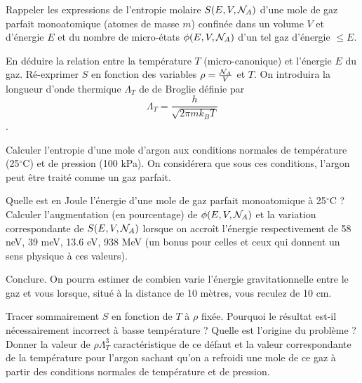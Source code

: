 \question
Rappeler les expressions de l'entropie molaire $S(E,V,{\cal N}_A)$ d'une mole de gaz parfait monoatomique (atomes de masse $m$) confinée dans un volume $V$ et d'énergie $E$ et du nombre de micro-états $\phi(E,V,{\cal N}_A)$ d'un tel gaz d'énergie $\leq E$. 

\question En déduire la relation entre la température $T$ (micro-canonique) et l'énergie $E$ du gaz. Ré-exprimer $S$ en fonction des variables $\rho=\frac{{\cal N}_A}{V}$ et $T$. On introduira la longueur d'onde thermique $\Lambda_T$ de de Broglie définie par
$$\Lambda_T=\frac{h}{\sqrt{2 \pi m k_B T}}$$.

\question Calculer l'entropie d'une mole d'argon aux conditions normales de température (25$^\circ$C) et de pression (100 kPa).
On considérera que sous ces conditions, l'argon peut être traité comme un gaz parfait.

\question Quelle est en Joule l'énergie d'une mole de gaz parfait monoatomique à  25$^\circ$C ? Calculer l'augmentation (en pourcentage) de $\phi(E,V,{\cal N}_A)$ et la variation correspondante de $S(E,V,{\cal N}_A)$  lorsque on accroît l'énergie respectivement de 58 neV, 39 meV, 13.6 eV, 938 MeV (un bonus pour celles et ceux qui donnent un sens physique à ces valeurs). 

\question Conclure. On pourra estimer de combien varie l'énergie gravitationnelle entre le gaz et vous lorsque, situé à la distance de 10 mètres, vous reculez de 10 cm.

\question Tracer sommairement $S$ en fonction de $T$ à $\rho$ fixée. Pourquoi le résultat est-il nécessairement incorrect à basse température ? Quelle est l'origine du problème ? Donner la valeur de $\rho \Lambda_T^3 $ caractéristique de ce défaut et la valeur correspondante de la température pour l'argon sachant qu'on a refroidi une mole de ce gaz à partir des conditions normales de température et de pression.
